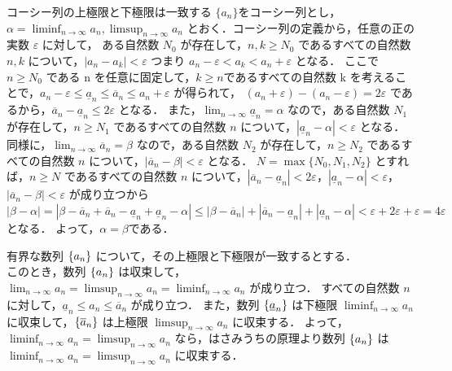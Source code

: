 \documentclass[a4paper]{ltjsarticle}
\begin{document}
  \begin{lemma}{コーシー列の上極限と下極限は一致する}{}
   $\{a_n\}$をコーシー列とし，$\alpha = \displaystyle \liminf_{n \to \infty} a_n, \limsup_{n \to \infty} a_n$ とおく．コーシー列の定義から，任意の正の実数 $\varepsilon$ に対して，
   ある自然数 $N_0$ が存在して，$n, k \geq N_0$ であるすべての自然数 $n, k$ について，$|a_n - a_k| < \varepsilon$ つまり $a_n - \varepsilon < a_k < a_n+ \varepsilon$ となる．
   ここで $n \geq N_0$ である n を任意に固定して，$k \geq n $であるすべての自然数 k を考えることで，$a_n - \varepsilon \leq \underline{a}_n \leq \overline{a}_n \leq a_n + \varepsilon$ が得られて，
   $(a_n + \varepsilon) - (a_n - \varepsilon ) = 2\varepsilon$ であるから，$\overline{a}_n - \underline{a}_n \leq 2\varepsilon$
   となる．
   また，$\displaystyle \lim_{n \to \infty} \underline{a}_n = \alpha$ なので，ある自然数 $N_1$ が存在して，$n \geq N_1$ であるすべての自然数 $n$ について，$|\underline{a}_n - \alpha| < \varepsilon$ となる．
   同様に，$\displaystyle \lim_{n \to \infty} \overline{a}_n = \beta$ なので，ある自然数 $N_2$ が存在して，$n \geq N_2$ であるすべての自然数 $n$ について，$|\overline{a}_n - \beta| < \varepsilon$ となる．
   $N = \max\{N_0, N_1, N_2\}$ とすれば，$n \geq N$ であるすべての自然数 $n$ について，$|\overline{a}_n - \underline{a}_n| < 2\varepsilon$，$|\underline{a}_n - \alpha| < \varepsilon$，$|\overline{a}_n - \beta| < \varepsilon$ が成り立つから
   $|\beta - \alpha| = |\beta - \overline{a}_n + \overline{a}_n - \underline{a}_n + \underline{a}_n - \alpha| \leq |\beta - \overline{a}_n |+ |\overline{a}_n - \underline{a}_n| + | \underline{a}_n - \alpha| < \varepsilon + 2\varepsilon + \varepsilon = 4\varepsilon$ となる． 
   よって，$\alpha = \beta $である．
  \end{lemma}

  \begin{lemma}{有界な数列 $\{a_n\}$ について，その上極限と下極限が一致するとする．
    \\ このとき，数列 $\{a_n\}$ は収束して，\\ 
    $\displaystyle \lim_{n \to \infty} a_n = \limsup_{n \to \infty} a_n = \liminf_{n \to \infty} a_n$ が成り立つ．  }{}
  すべての自然数 $n$ に対して，$\underline{a}_n \leq a_n \leq \overline{a}_n$ が成り立つ．
  また，数列 $\{\underline{a}_n\}$ は下極限 $\displaystyle \liminf_{n \to \infty} a_n$  に収束して，$\{\overline{a}_n\}$ は上極限 $\displaystyle \limsup_{n \to \infty} a_n$ に収束する．
  よって，$\displaystyle \liminf_{n \to \infty} a_n= \displaystyle \limsup_{n \to \infty} a_n$ なら，はさみうちの原理より数列 $\{a_n\}$ は $\displaystyle \liminf_{n \to \infty} a_n = \displaystyle \limsup_{n \to \infty} a_n$ に収束する．
\end{lemma}
  
\end{document}
